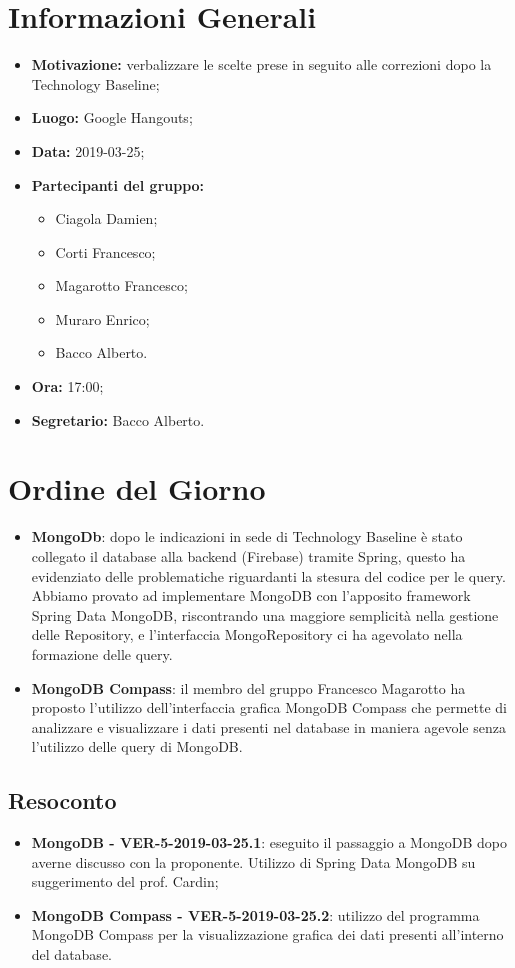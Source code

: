 \documentclass[a4paper, oneside, openany, dvipsnames, table]{article}
\begin{document}
\copertina{}


\newpage
\tableofcontents
\newpage
\section{Informazioni Generali}
\begin{itemize}
\item \textbf{Motivazione:} verbalizzare le scelte prese in seguito alle correzioni dopo la Technology Baseline;
\item \textbf{Luogo:} Google Hangouts;
\item \textbf{Data:} 2019-03-25;
\item \textbf{Partecipanti del gruppo:} \hfill
	\begin{itemize}
		\item Ciagola Damien;
		\item Corti Francesco;
		\item Magarotto Francesco;
		\item Muraro Enrico;
		\item Bacco Alberto.
	\end{itemize} 
\item \textbf{Ora:} 17:00;
\item \textbf{Segretario:} Bacco Alberto.
\end{itemize}

\section{Ordine del Giorno}
\begin{itemize}
	\item \textbf{MongoDb}: 
	dopo le indicazioni in sede di Technology Baseline è stato 
	collegato il database alla backend (Firebase) tramite Spring, questo ha evidenziato delle problematiche riguardanti la stesura
	del codice per le query. 
	Abbiamo provato ad implementare MongoDB con l'apposito framework Spring Data MongoDB, riscontrando
	una maggiore semplicità nella gestione delle Repository, e
	l'interfaccia MongoRepository ci ha agevolato nella 
	formazione delle query.
	\item \textbf{MongoDB Compass}: il membro del gruppo Francesco Magarotto ha proposto l'utilizzo dell'interfaccia grafica MongoDB Compass che permette di analizzare e visualizzare  i dati presenti nel database in maniera agevole senza l'utilizzo delle query di MongoDB. 
\end{itemize}

\subsection{Resoconto}
\begin{itemize}
	\item \textbf{MongoDB - VER-5-2019-03-25.1}: 
	eseguito il passaggio a MongoDB dopo averne discusso con la 
	proponente. Utilizzo di Spring Data MongoDB su suggerimento del prof. Cardin;
	\item \textbf{MongoDB Compass - VER-5-2019-03-25.2}:
	utilizzo del programma MongoDB Compass per la visualizzazione grafica dei dati presenti all'interno del database.
	
	
\end{itemize}
\end{document}
